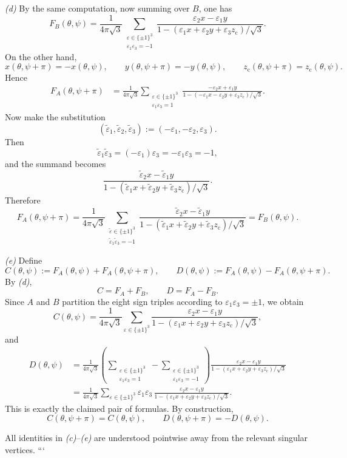 \smallskip
\noindent\emph{(d)} By the same computation, now summing over \(B\), one has
\[
F_B(\theta,\psi)
=
\frac{1}{4\pi\sqrt3}
\sum_{\substack{\varepsilon\in\{\pm1\}^3\\ \varepsilon_1\varepsilon_3=-1}}
\frac{\varepsilon_2 x-\varepsilon_1 y}
{1-(\varepsilon_1 x+\varepsilon_2 y+\varepsilon_3 z_{\mathrm c})/\sqrt3}.
\]
On the other hand,
\[
x(\theta,\psi+\pi)=-x(\theta,\psi),\qquad
y(\theta,\psi+\pi)=-y(\theta,\psi),\qquad
z_{\mathrm c}(\theta,\psi+\pi)=z_{\mathrm c}(\theta,\psi).
\]
Hence
\begin{align*}
F_A(\theta,\psi+\pi)
&=
\frac{1}{4\pi\sqrt3}
\sum_{\substack{\varepsilon\in\{\pm1\}^3\\ \varepsilon_1\varepsilon_3=1}}
\frac{-\varepsilon_2 x+\varepsilon_1 y}
{1-(-\varepsilon_1 x-\varepsilon_2 y+\varepsilon_3 z_{\mathrm c})/\sqrt3}.
\end{align*}
Now make the substitution
\[
(\widetilde\varepsilon_1,\widetilde\varepsilon_2,\widetilde\varepsilon_3)
:=(-\varepsilon_1,-\varepsilon_2,\varepsilon_3).
\]
Then
\[
\widetilde\varepsilon_1\widetilde\varepsilon_3
=(-\varepsilon_1)\varepsilon_3
=-\varepsilon_1\varepsilon_3=-1,
\]
and the summand becomes
\[
\frac{\widetilde\varepsilon_2 x-\widetilde\varepsilon_1 y}
{1-(\widetilde\varepsilon_1 x+\widetilde\varepsilon_2 y+\widetilde\varepsilon_3 z_{\mathrm c})/\sqrt3}.
\]
Therefore
\[
F_A(\theta,\psi+\pi)
=
\frac{1}{4\pi\sqrt3}
\sum_{\substack{\widetilde\varepsilon\in\{\pm1\}^3\\ \widetilde\varepsilon_1\widetilde\varepsilon_3=-1}}
\frac{\widetilde\varepsilon_2 x-\widetilde\varepsilon_1 y}
{1-(\widetilde\varepsilon_1 x+\widetilde\varepsilon_2 y+\widetilde\varepsilon_3 z_{\mathrm c})/\sqrt3}
=
F_B(\theta,\psi).
\]

\smallskip
\noindent\emph{(e)} Define
\[
C(\theta,\psi):=F_A(\theta,\psi)+F_A(\theta,\psi+\pi),
\qquad
D(\theta,\psi):=F_A(\theta,\psi)-F_A(\theta,\psi+\pi).
\]
By \emph{(d)},
\[
C=F_A+F_B,
\qquad
D=F_A-F_B.
\]
Since \(A\) and \(B\) partition the eight sign triples according to \(\varepsilon_1\varepsilon_3=\pm1\), we obtain
\[
C(\theta,\psi)
=
\frac{1}{4\pi\sqrt3}
\sum_{\varepsilon\in\{\pm1\}^3}
\frac{\varepsilon_2 x-\varepsilon_1 y}
{1-(\varepsilon_1 x+\varepsilon_2 y+\varepsilon_3 z_{\mathrm c})/\sqrt3},
\]
and
\begin{align*}
D(\theta,\psi)
&=
\frac{1}{4\pi\sqrt3}
\left(
\sum_{\substack{\varepsilon\in\{\pm1\}^3\\ \varepsilon_1\varepsilon_3=1}}
-
\sum_{\substack{\varepsilon\in\{\pm1\}^3\\ \varepsilon_1\varepsilon_3=-1}}
\right)
\frac{\varepsilon_2 x-\varepsilon_1 y}
{1-(\varepsilon_1 x+\varepsilon_2 y+\varepsilon_3 z_{\mathrm c})/\sqrt3} \\
&=
\frac{1}{4\pi\sqrt3}
\sum_{\varepsilon\in\{\pm1\}^3}
\varepsilon_1\varepsilon_3\,
\frac{\varepsilon_2 x-\varepsilon_1 y}
{1-(\varepsilon_1 x+\varepsilon_2 y+\varepsilon_3 z_{\mathrm c})/\sqrt3}.
\end{align*}
This is exactly the claimed pair of formulas. By construction,
\[
C(\theta,\psi+\pi)=C(\theta,\psi),
\qquad
D(\theta,\psi+\pi)=-D(\theta,\psi).
\]

All identities in \emph{(c)}--\emph{(e)} are understood pointwise away from the relevant singular vertices.
```